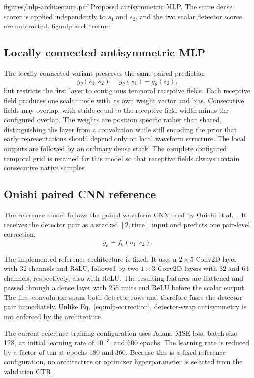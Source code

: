 \reportfigure
    {figures/mlp-architecture.pdf}
    {Proposed antisymmetric MLP. The same dense scorer is applied independently to \(s_1\) and \(s_2\), and the two scalar detector scores are subtracted.}
    {fig:mlp-architecture}

\subsection{Locally connected antisymmetric MLP}
The locally connected variant preserves the same paired prediction
\[
    y_{\theta}(s_1,s_2)=g_{\theta}(s_1)-g_{\theta}(s_2),
\]
but restricts the first layer to contiguous temporal receptive fields. Each receptive field produces one scalar node with its own weight vector and bias. Consecutive fields may overlap, with stride equal to the receptive-field width minus the configured overlap. The weights are position specific rather than shared, distinguishing the layer from a convolution while still encoding the prior that early representations should depend only on local waveform structure. The local outputs are followed by an ordinary dense stack. The complete configured temporal grid is retained for this model so that receptive fields always contain consecutive native samples.

\subsection{Onishi paired CNN reference}\label{sec:onishi-model}

The reference model follows the paired-waveform CNN used by Onishi et al.~\cite{onishi2022}. It receives the detector pair as a stacked \([2,\mathrm{time}]\) input and predicts one pair-level correction,
\begin{equation}\label{eq:onishi-correction}
    y_\theta=f_\theta(s_1,s_2).
\end{equation}

The implemented reference architecture is fixed. It uses a \(2\times5\) Conv2D layer with 32 channels and ReLU, followed by two \(1\times3\) Conv2D layers with 32 and 64 channels, respectively, also with ReLU. The resulting features are flattened and passed through a dense layer with 256 units and ReLU before the scalar output. The first convolution spans both detector rows and therefore fuses the detector pair immediately. Unlike Eq.~\eqref{eq:mlp-correction}, detector-swap antisymmetry is not enforced by the architecture.

The current reference training configuration uses Adam, MSE loss, batch size 128, an initial learning rate of \(10^{-3}\), and 600 epochs. The learning rate is reduced by a factor of ten at epochs 180 and 360. Because this is a fixed reference configuration, no architecture or optimizer hyperparameter is selected from the validation CTR.


